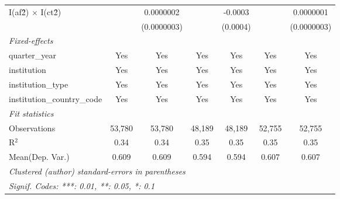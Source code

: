 \begin{tabular}{lcccccc}
   I(af\^2) $\times$ I(ct\^2)         &               & 0.0000002     &               & -0.0003        &               & 0.0000001\\   
                                      &               & (0.0000003)   &               & (0.0004)       &               & (0.0000003)\\   
   \midrule
   \emph{Fixed-effects}\\
   quarter\_year                      & Yes           & Yes           & Yes           & Yes            & Yes           & Yes\\  
   institution                        & Yes           & Yes           & Yes           & Yes            & Yes           & Yes\\  
   institution\_type                  & Yes           & Yes           & Yes           & Yes            & Yes           & Yes\\  
   institution\_country\_code         & Yes           & Yes           & Yes           & Yes            & Yes           & Yes\\  
   \midrule
   \emph{Fit statistics}\\
   Observations                       & 53,780        & 53,780        & 48,189        & 48,189         & 52,755        & 52,755\\  
   R$^2$                              & 0.34          & 0.34          & 0.35          & 0.35           & 0.35          & 0.35\\  
Mean(Dep. Var.) & 0.609 & 0.609 & 0.594 & 0.594 & 0.607 & 0.607 \\
   \midrule \midrule
   \multicolumn{7}{l}{\emph{Clustered (author) standard-errors in parentheses}}\\
   \multicolumn{7}{l}{\emph{Signif. Codes: ***: 0.01, **: 0.05, *: 0.1}}\\
\end{tabular}
\par\endgroup
